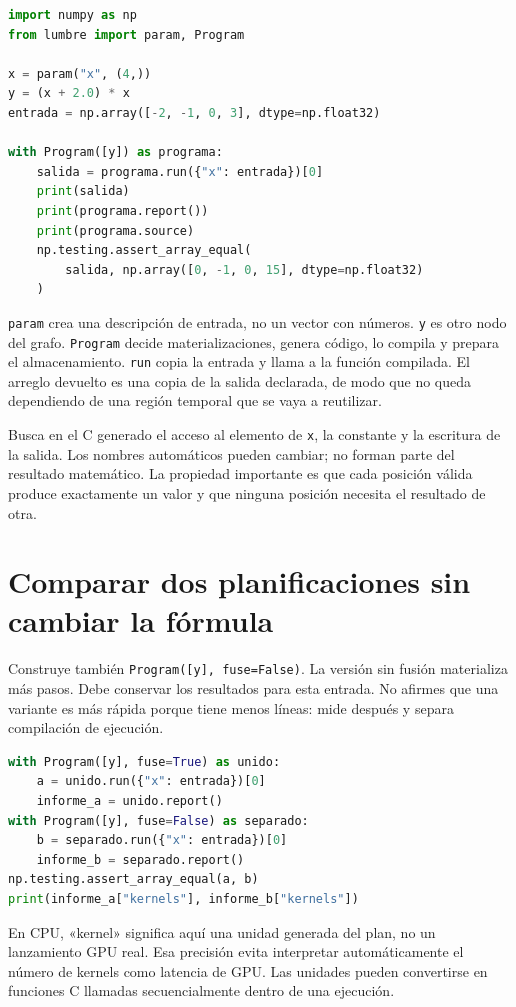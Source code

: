 \documentclass[12pt,a4paper,oneside]{report}
\begin{document}
\begin{lstlisting}[language=Python]
import numpy as np
from lumbre import param, Program

x = param("x", (4,))
y = (x + 2.0) * x
entrada = np.array([-2, -1, 0, 3], dtype=np.float32)

with Program([y]) as programa:
    salida = programa.run({"x": entrada})[0]
    print(salida)
    print(programa.report())
    print(programa.source)
    np.testing.assert_array_equal(
        salida, np.array([0, -1, 0, 15], dtype=np.float32)
    )
\end{lstlisting}
\texttt{param} crea una descripción de entrada, no un vector con números. \texttt{y} es otro nodo del grafo. \texttt{Program} decide materializaciones, genera código, lo compila y prepara el almacenamiento. \texttt{run} copia la entrada y llama a la función compilada. El arreglo devuelto es una copia de la salida declarada, de modo que no queda dependiendo de una región temporal que se vaya a reutilizar.

Busca en el C generado el acceso al elemento de \texttt{x}, la constante y la escritura de la salida. Los nombres automáticos pueden cambiar; no forman parte del resultado matemático. La propiedad importante es que cada posición válida produce exactamente un valor y que ninguna posición necesita el resultado de otra.

\section{Comparar dos planificaciones sin cambiar la fórmula}
Construye también \texttt{Program([y],\allowbreak{} fuse=False)}. La versión sin fusión materializa más pasos. Debe conservar los resultados para esta entrada. No afirmes que una variante es más rápida porque tiene menos líneas: mide después y separa compilación de ejecución.

\begin{lstlisting}[language=Python]
with Program([y], fuse=True) as unido:
    a = unido.run({"x": entrada})[0]
    informe_a = unido.report()
with Program([y], fuse=False) as separado:
    b = separado.run({"x": entrada})[0]
    informe_b = separado.report()
np.testing.assert_array_equal(a, b)
print(informe_a["kernels"], informe_b["kernels"])
\end{lstlisting}
En CPU, «kernel» significa aquí una unidad generada del plan, no un lanzamiento GPU real. Esa precisión evita interpretar automáticamente el número de kernels como latencia de GPU. Las unidades pueden convertirse en funciones C llamadas secuencialmente dentro de una ejecución.
\end{document}
